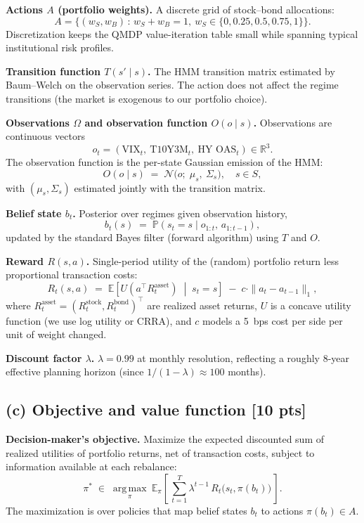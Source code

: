 \documentclass[12pt]{article}
\newcommand{\R}{\mathbb{R}}
\newcommand{\EE}{\mathbb{E}}
\newcommand{\Prb}{\mathbb{P}}
\newcommand{\argmax}{\operatorname*{arg\,max}}
\begin{document}
\textbf{Actions $A$ (portfolio weights).} A discrete grid of stock--bond allocations:
\[
  A = \big\{(w_S, w_B) \,:\, w_S + w_B = 1,\ w_S \in \{0, 0.25, 0.5, 0.75, 1\}\big\}.
\]
Discretization keeps the QMDP value-iteration table small while spanning typical institutional risk profiles.

\textbf{Transition function $T(s' \mid s)$.} The HMM transition matrix estimated by Baum--Welch on the observation series. The action does not affect the regime transitions (the market is exogenous to our portfolio choice).

\textbf{Observations $\Omega$ and observation function $O(o \mid s)$.} Observations are continuous vectors
\[
  o_t = (\text{VIX}_t,\ \text{T10Y3M}_t,\ \text{HY OAS}_t) \in \R^3.
\]
The observation function is the per-state Gaussian emission of the HMM:
\[
  O(o \mid s) \;=\; \mathcal{N}\!\big(o ;\; \mu_s,\ \Sigma_s\big), \quad s \in S,
\]
with $(\mu_s, \Sigma_s)$ estimated jointly with the transition matrix.

\textbf{Belief state $b_t$.} Posterior over regimes given observation history,
\[
  b_t(s) \;=\; \Prb(s_t = s \mid o_{1:t},\,a_{1:t-1}),
\]
updated by the standard Bayes filter (forward algorithm) using $T$ and $O$.

\textbf{Reward $R(s, a)$.} Single-period utility of the (random) portfolio return less proportional transaction costs:
\[
  R_t(s, a) \;=\; \EE\!\left[ U\!\left(a^\top R_t^{\text{asset}}\right) \;\middle|\; s_t = s \right] \;-\; c \cdot \|a_t - a_{t-1}\|_1,
\]
where $R_t^{\text{asset}} = (R_t^{\text{stock}}, R_t^{\text{bond}})^\top$ are realized asset returns, $U$ is a concave utility function (we use log utility or CRRA), and $c$ models a 5~bps cost per side per unit of weight changed.

\textbf{Discount factor $\lambda$.} $\lambda = 0.99$ at monthly resolution, reflecting a roughly 8-year effective planning horizon (since $1/(1-\lambda) \approx 100$ months).

\subsection*{(c) Objective and value function \hfill [10 pts]}

\textbf{Decision-maker's objective.} Maximize the expected discounted sum of realized utilities of portfolio returns, net of transaction costs, subject to information available at each rebalance:
\[
  \pi^* \;\in\; \argmax_{\pi}\ \EE_{\pi}\!\left[\, \sum_{t=1}^{T} \lambda^{t-1}\, R_t\bigl(s_t, \pi(b_t)\bigr) \,\right].
\]
The maximization is over policies that map belief states $b_t$ to actions $\pi(b_t) \in A$.
\end{document}
